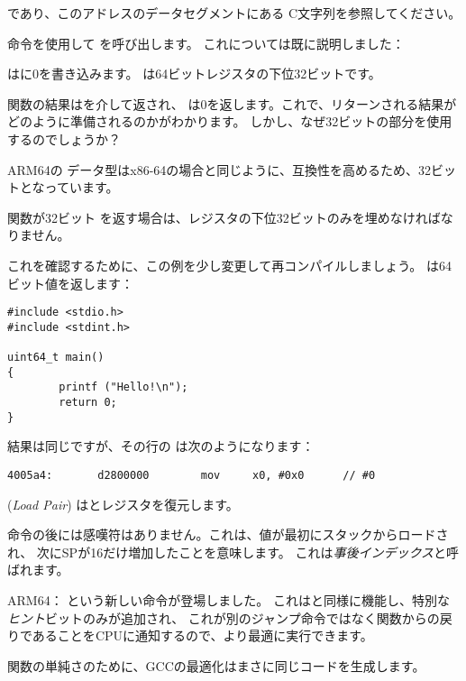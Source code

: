 であり、このアドレスのデータセグメントにある C文字列を参照してください。


命令を使用して \puts を呼び出します。 これについては既に説明しました：

\MOV はに0を書き込みます。 
は64ビットレジスタの下位32ビットです。



関数の結果はを介して返され、 \main は0を返します。これで、リターンされる結果がどのように準備されるのかがわかります。
しかし、なぜ32ビットの部分を使用するのでしょうか？

ARM64の \Tint データ型はx86-64の場合と同じように、互換性を高めるため、32ビットとなっています。

関数が32ビット \Tint を返す場合は、レジスタの下位32ビットのみを埋めなければなりません。

これを確認するために、この例を少し変更して再コンパイルしましょう。 \main は64ビット値を返します：

\begin{lstlisting}[caption=\main returning a value of \TT{uint64\_t} type,style=customc]
#include <stdio.h>
#include <stdint.h>

uint64_t main()
{
        printf ("Hello!\n");
        return 0;
}
\end{lstlisting}

結果は同じですが、その行の \MOV は次のようになります：

\begin{lstlisting}[caption=\NonOptimizing GCC 4.8.1 + objdump]
  4005a4:       d2800000        mov     x0, #0x0      // #0
\end{lstlisting}


 (\emph{Load Pair}) はとレジスタを復元します。

命令の後には感嘆符はありません。これは、値が最初にスタックからロードされ、
次に\ac{SP}が16だけ増加したことを意味します。
これは\emph{事後インデックス}と呼ばれます。

ARM64： \RET という新しい命令が登場しました。 
これはと同様に機能し、特別な\emph{ヒント}ビットのみが追加され、
これが別のジャンプ命令ではなく関数からの戻りであることを\ac{CPU}に通知するので、より最適に実行できます。

関数の単純さのために、GCCの最適化はまさに同じコードを生成します。
